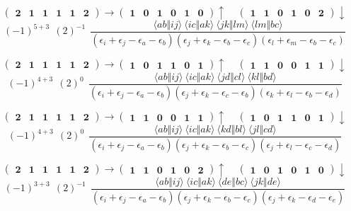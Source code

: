 \documentclass[12pt,oneside,a4paper,fleqn]{article}
\begin{document}
\[ \boldsymbol{ \begin{pmatrix} 2 & 1 & 1 & 1 & 1 & 2 \end{pmatrix} \rightarrow \begin{pmatrix} 1 & 0 & 1 & 0 & 1 & 0 \end{pmatrix} \uparrow~~~~~\begin{pmatrix} 1 & 1 & 0 & 1 & 0 & 2 \end{pmatrix} \downarrow } \]
$$(-1)^{5+3}~~(2)^{-1}~~\frac{\langle ab \Vert ij \rangle ~\langle ic \Vert ak \rangle ~\langle jk \Vert lm \rangle ~\langle lm \Vert bc \rangle }{(\epsilon_i +\epsilon_j -\epsilon_a -\epsilon_b ) (\epsilon_j +\epsilon_k -\epsilon_b -\epsilon_c ) (\epsilon_l +\epsilon_m -\epsilon_b -\epsilon_c ) }$$

\[ \boldsymbol{ \begin{pmatrix} 2 & 1 & 1 & 1 & 1 & 2 \end{pmatrix} \rightarrow \begin{pmatrix} 1 & 0 & 1 & 1 & 0 & 1 \end{pmatrix} \uparrow~~~~~\begin{pmatrix} 1 & 1 & 0 & 0 & 1 & 1 \end{pmatrix} \downarrow } \]
$$(-1)^{4+3}~~(2)^{0}~~\frac{\langle ab \Vert ij \rangle ~\langle ic \Vert ak \rangle ~\langle jd \Vert cl \rangle ~\langle kl \Vert bd \rangle }{(\epsilon_i +\epsilon_j -\epsilon_a -\epsilon_b ) (\epsilon_j +\epsilon_k -\epsilon_c -\epsilon_b ) (\epsilon_k +\epsilon_l -\epsilon_b -\epsilon_d ) }$$

\[ \boldsymbol{ \begin{pmatrix} 2 & 1 & 1 & 1 & 1 & 2 \end{pmatrix} \rightarrow \begin{pmatrix} 1 & 1 & 0 & 0 & 1 & 1 \end{pmatrix} \uparrow~~~~~\begin{pmatrix} 1 & 0 & 1 & 1 & 0 & 1 \end{pmatrix} \downarrow } \]
$$(-1)^{4+3}~~(2)^{0}~~\frac{\langle ab \Vert ij \rangle ~\langle ic \Vert ak \rangle ~\langle kd \Vert bl \rangle ~\langle jl \Vert cd \rangle }{(\epsilon_i +\epsilon_j -\epsilon_a -\epsilon_b ) (\epsilon_j +\epsilon_k -\epsilon_b -\epsilon_c ) (\epsilon_j +\epsilon_l -\epsilon_c -\epsilon_d ) }$$

\[ \boldsymbol{ \begin{pmatrix} 2 & 1 & 1 & 1 & 1 & 2 \end{pmatrix} \rightarrow \begin{pmatrix} 1 & 1 & 0 & 1 & 0 & 2 \end{pmatrix} \uparrow~~~~~\begin{pmatrix} 1 & 0 & 1 & 0 & 1 & 0 \end{pmatrix} \downarrow } \]
$$(-1)^{3+3}~~(2)^{-1}~~\frac{\langle ab \Vert ij \rangle ~\langle ic \Vert ak \rangle ~\langle de \Vert bc \rangle ~\langle jk \Vert de \rangle }{(\epsilon_i +\epsilon_j -\epsilon_a -\epsilon_b ) (\epsilon_j +\epsilon_k -\epsilon_b -\epsilon_c ) (\epsilon_j +\epsilon_k -\epsilon_d -\epsilon_e ) }$$
\end{document}
